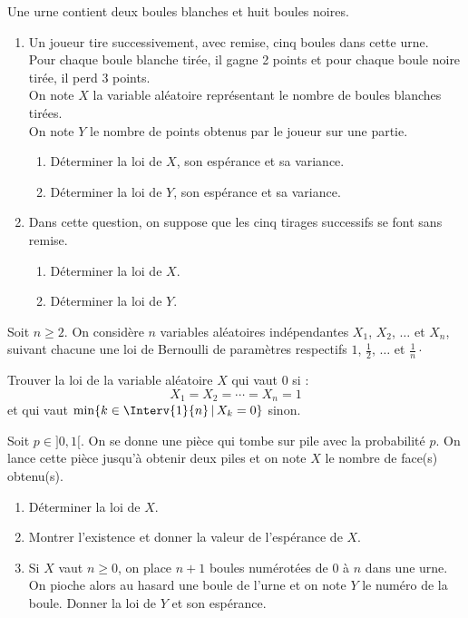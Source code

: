 \documentclass[a4paper,10pt]{report}
\begin{document}
\begin{Exercice}{} Une urne contient deux boules blanches et huit boules noires.
\begin{enumerate}
\item
Un joueur tire successivement, avec remise,  cinq boules dans cette urne.\\
Pour chaque boule blanche tirée, il gagne 2 points et pour chaque boule noire tirée, il perd 3 points.\\
On note $X$ la variable aléatoire représentant le nombre de boules blanches tirées.\\
On note $Y$ le nombre de points obtenus par le joueur sur une partie.
\begin{enumerate}
\item
Déterminer la loi de $X$, son espérance et sa variance.
\item
Déterminer la loi de $Y$, son espérance et sa variance.
\end{enumerate}
\item
Dans cette question, on suppose que les cinq tirages successifs se font sans remise.
\begin{enumerate}
\item 
Déterminer la loi de $X$.
\item
Déterminer la loi de $Y$.
\end{enumerate}
\end{enumerate}
\end{Exercice}




\begin{Exercice}{} Soit $n \geq 2$. On considère $n$ variables aléatoires indépendantes $X_1$, $X_2$, $\ldots$ et $X_n$, suivant chacune une loi de Bernoulli de paramètres respectifs $1$, $\tfrac{1}{2}$, $\ldots$ et $\tfrac{1}{n}\cdot$

\noindent Trouver la loi de la variable aléatoire $X$ qui vaut $0$ si :
$$ X_1= X_2= \cdots = X_n = 1$$
et qui vaut $\min \lbrace k \in \Interv{1}{n} \, \vert \, X_k =0 \rbrace$ sinon.
\end{Exercice} 

\begin{Exercice}{} Soit $p \in ]0,1[$. On se donne une pièce qui tombe sur pile avec la probabilité $p$. On lance cette pièce jusqu'à obtenir deux piles et on note $X$ le nombre de face(s) obtenu(s).

\begin{enumerate}
\item Déterminer la loi de $X$.
\item Montrer l'existence et donner la valeur de l'espérance de $X$.
\item Si $X$ vaut $n \geq 0$, on place $n+1$ boules numérotées de $0$ à $n$ dans une urne. On pioche alors au hasard une boule de l'urne et on note $Y$ le numéro de la boule. Donner la loi de $Y$ et son espérance.
\end{enumerate}   
\end{Exercice}
\end{document}
